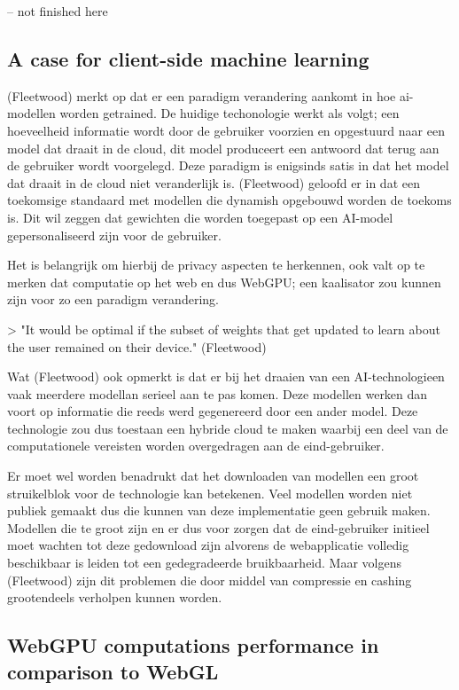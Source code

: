 -- not finished here


\subsection{A case for client-side machine learning}

(Fleetwood) merkt op dat er een paradigm verandering aankomt in hoe ai-modellen worden getrained. De huidige techonologie werkt als volgt; een hoeveelheid informatie wordt door de gebruiker voorzien en opgestuurd naar een model dat draait in de cloud, dit model produceert een antwoord dat terug aan de gebruiker wordt voorgelegd. Deze paradigm is enigsinds satis in dat het model dat draait in de cloud niet veranderlijk is. (Fleetwood) geloofd er in dat een toekomsige standaard met modellen die dynamish opgebouwd worden de toekoms is. Dit wil zeggen dat gewichten die worden toegepast op een AI-model gepersonaliseerd zijn voor de gebruiker.

Het is belangrijk om hierbij de privacy aspecten te herkennen, ook valt op te merken dat computatie op het web en dus WebGPU; een kaalisator zou kunnen zijn voor zo een paradigm verandering.

> "It would be optimal if the subset of weights that get updated to learn about the user remained on their device." (Fleetwood)

Wat (Fleetwood) ook opmerkt is dat er bij het draaien van een AI-technologieen vaak meerdere modellan serieel aan te pas komen. Deze modellen werken dan voort op informatie die reeds werd gegenereerd door een ander model. Deze technologie zou dus toestaan een hybride cloud te maken waarbij een deel van de computationele vereisten worden overgedragen aan de eind-gebruiker.

Er moet wel worden benadrukt dat het downloaden van modellen een groot struikelblok voor de technologie kan betekenen. Veel modellen worden niet publiek gemaakt dus die kunnen van deze implementatie geen gebruik maken. Modellen die te groot zijn en er dus voor zorgen dat de eind-gebruiker initieel moet wachten tot deze gedownload zijn alvorens de webapplicatie volledig beschikbaar is leiden tot een gedegradeerde bruikbaarheid. Maar volgens (Fleetwood) zijn dit problemen die door middel van compressie en cashing grootendeels verholpen kunnen worden.

\subsection{WebGPU computations performance in comparison to WebGL}

